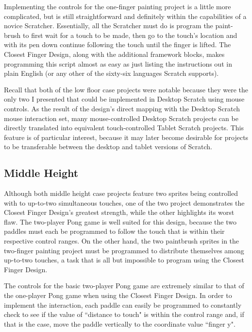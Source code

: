 Implementing the controls for the one-finger painting project is a little more complicated, but is still straightforward and definitely within the capabilities of a novice Scratcher. Essentially, all the Scratcher must do is program the paint-brush to first wait for a touch to be made, then go to the touch's location and with its pen down continue following the touch until the finger is lifted. The Closest Finger Design, along with the additional framework blocks, makes programming this script almost as easy as just listing the instructions out in plain English (or any other of the sixty-six languages Scratch supports).

Recall that both of the low floor case projects were notable because they were the only two I presented that could be implemented in Desktop Scratch using mouse controls. As the result of the design's direct mapping with the Desktop Scratch mouse interaction set, many mouse-controlled Desktop Scratch projects can be directly translated into equivalent touch-controlled Tablet Scratch projects. This feature is of particular interest, because it may later become desirable for projects to be transferable between the desktop and tablet versions of Scratch.

\subsection{Middle Height}

Although both middle height case projects feature two sprites being controlled with to up-to-two simultaneous touches, one of the two project demonstrates the Closest Finger Design's greatest strength, while the other highlights its worst flaw. The two-player Pong game is well suited for this design, because the two paddles must each be programmed to follow the touch that is within their respective control ranges. On the other hand, the two paintbrush sprites in the two-finger painting project must be programmed to distribute themselves among up-to-two touches, a task that is all but impossible to program using the Closest Finger Design.

The controls for the basic two-player Pong game are extremely similar to that of the one-player Pong game when using the Closest Finger Design. In order to implement the interaction, each paddle can easily be programmed to constantly check to see if the value of ``distance to touch" is within the control range and, if that is the case, move the paddle vertically to the coordinate value ``finger y". 

